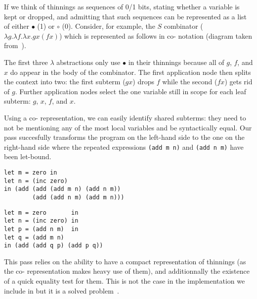 If we think of thinnings as sequences of 0/1 bits, stating whether a variable is kept or dropped, and admitting that such sequences can be represented as a list of either $\bullet$ (1) or $\circ$ (0).
Consider, for example, the $S$ combinator ($\lambda g. \lambda f. \lambda x. g x (f x)$) which is represented as follows in co-\DeBruijn{} notation (diagram taken from~\cite{MANUAL:draft/Allais22}).

\begin{center}
  \codebruijnexamplegraph{}
\end{center}

The first three $\lambda$ abstractions only use $\bullet$ in their thinnings because all of $g$, $f$, and $x$ do appear in the body of the combinator.
%
The first application node then splits the context into two: the first subterm ($g x$) drops $f$ while the second ($f x$) gets rid of $g$.
%
Further application nodes select the one variable still in scope for each leaf subterm: $g$, $x$, $f$, and $x$.

Using a co-\DeBruijn{} representation, we can easily identify shared subterms:
%
they need to not be mentioning any of the most local variables and be syntactically equal.
%
Our pass succesfully transforms the program on the left-hand side to the one
on the right-hand side where the repeated expressions \texttt{(add m n)}
and \texttt{(add n m)} have been let-bound.

\begin{center}
  \begin{minipage}[t]{0.4\textwidth}
    \begin{Verbatim}
let m = zero in
let n = (inc zero)
in (add (add (add m n) (add n m))
        (add (add n m) (add m n)))
    \end{Verbatim}
  \end{minipage}\hfill\begin{minipage}[t]{0.4\textwidth}
    \begin{Verbatim}
let m = zero       in
let n = (inc zero) in
let p = (add n m)  in
let q = (add m n)
in (add (add q p) (add p q))
    \end{Verbatim}
  \end{minipage}
\end{center}

This pass relies on the ability to have a compact representation of thinnings
(as the co-\DeBruijn{} representation makes heavy use of them),
and additionnally the existence of a quick equality test for them.
%
This is not the case in the implementation we include in \Velo{} but
it is a solved problem~\cite{MANUAL:draft/Allais22}.
